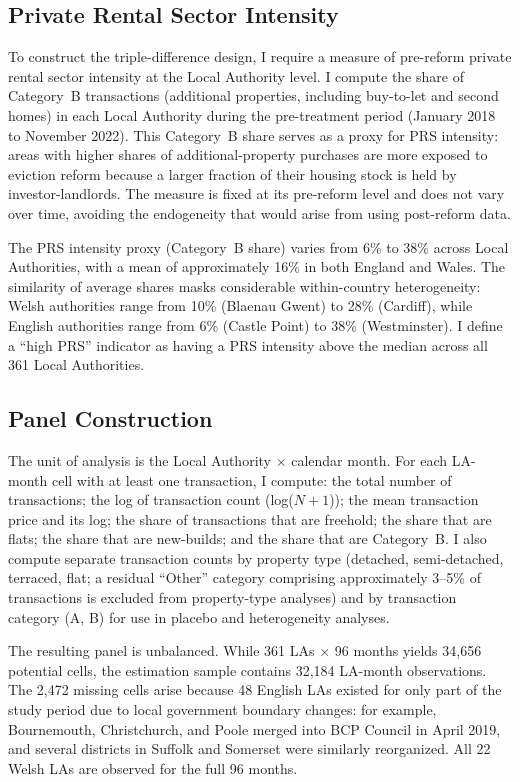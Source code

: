 \documentclass[12pt]{article}
\begin{document}
\subsection{Private Rental Sector Intensity}

To construct the triple-difference design, I require a measure of pre-reform private rental sector intensity at the Local Authority level. I compute the share of Category~B transactions (additional properties, including buy-to-let and second homes) in each Local Authority during the pre-treatment period (January 2018 to November 2022). This Category~B share serves as a proxy for PRS intensity: areas with higher shares of additional-property purchases are more exposed to eviction reform because a larger fraction of their housing stock is held by investor-landlords. The measure is fixed at its pre-reform level and does not vary over time, avoiding the endogeneity that would arise from using post-reform data.

The PRS intensity proxy (Category~B share) varies from 6\% to 38\% across Local Authorities, with a mean of approximately 16\% in both England and Wales. The similarity of average shares masks considerable within-country heterogeneity: Welsh authorities range from 10\% (Blaenau Gwent) to 28\% (Cardiff), while English authorities range from 6\% (Castle Point) to 38\% (Westminster). I define a ``high PRS'' indicator as having a PRS intensity above the median across all 361 Local Authorities.

\subsection{Panel Construction}

The unit of analysis is the Local Authority $\times$ calendar month. For each LA-month cell with at least one transaction, I compute: the total number of transactions; the log of transaction count (log($N+1$)); the mean transaction price and its log; the share of transactions that are freehold; the share that are flats; the share that are new-builds; and the share that are Category~B. I also compute separate transaction counts by property type (detached, semi-detached, terraced, flat; a residual ``Other'' category comprising approximately 3--5\% of transactions is excluded from property-type analyses) and by transaction category (A, B) for use in placebo and heterogeneity analyses.

The resulting panel is unbalanced. While 361 LAs $\times$ 96 months yields 34,656 potential cells, the estimation sample contains 32,184 LA-month observations. The 2,472 missing cells arise because 48 English LAs existed for only part of the study period due to local government boundary changes: for example, Bournemouth, Christchurch, and Poole merged into BCP Council in April 2019, and several districts in Suffolk and Somerset were similarly reorganized. All 22 Welsh LAs are observed for the full 96 months.
\end{document}
